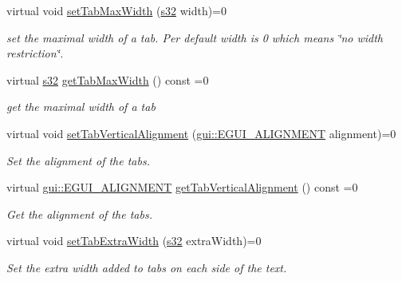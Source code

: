 \begin{DoxyCompactItemize}
virtual void \hyperlink{classirr_1_1gui_1_1IGUITabControl_a854b4d28fda5b9eb0ccc2f6a8c8e463c}{set\+Tab\+Max\+Width} (\hyperlink{namespaceirr_ac66849b7a6ed16e30ebede579f9b47c6}{s32} width)=0
\begin{DoxyCompactList}\small\item\em set the maximal width of a tab. Per default width is 0 which means \char`\"{}no width restriction\char`\"{}. \end{DoxyCompactList}\item 
\mbox{\label{classirr_1_1gui_1_1IGUITabControl_a6f5c5210417d07c3f87ce2db91341f3c}} 
virtual \hyperlink{namespaceirr_ac66849b7a6ed16e30ebede579f9b47c6}{s32} \hyperlink{classirr_1_1gui_1_1IGUITabControl_a6f5c5210417d07c3f87ce2db91341f3c}{get\+Tab\+Max\+Width} () const =0
\begin{DoxyCompactList}\small\item\em get the maximal width of a tab \end{DoxyCompactList}\item 
virtual void \hyperlink{classirr_1_1gui_1_1IGUITabControl_a5481d1c15605d00654c12581842ad311}{set\+Tab\+Vertical\+Alignment} (\hyperlink{namespaceirr_1_1gui_a19eb5fb40e67f108cb16aba922ddaa2d}{gui\+::\+E\+G\+U\+I\+\_\+\+A\+L\+I\+G\+N\+M\+E\+NT} alignment)=0
\begin{DoxyCompactList}\small\item\em Set the alignment of the tabs. \end{DoxyCompactList}\item 
virtual \hyperlink{namespaceirr_1_1gui_a19eb5fb40e67f108cb16aba922ddaa2d}{gui\+::\+E\+G\+U\+I\+\_\+\+A\+L\+I\+G\+N\+M\+E\+NT} \hyperlink{classirr_1_1gui_1_1IGUITabControl_a3153a7dba26548eda6a8013e1e669c18}{get\+Tab\+Vertical\+Alignment} () const =0
\begin{DoxyCompactList}\small\item\em Get the alignment of the tabs. \end{DoxyCompactList}\item 
\mbox{\label{classirr_1_1gui_1_1IGUITabControl_ab73b93ca48aabf376c4b10cf42db35d7}} 
virtual void \hyperlink{classirr_1_1gui_1_1IGUITabControl_ab73b93ca48aabf376c4b10cf42db35d7}{set\+Tab\+Extra\+Width} (\hyperlink{namespaceirr_ac66849b7a6ed16e30ebede579f9b47c6}{s32} extra\+Width)=0
\begin{DoxyCompactList}\small\item\em Set the extra width added to tabs on each side of the text. \end{DoxyCompactList}\item 

\end{DoxyCompactItemize}
